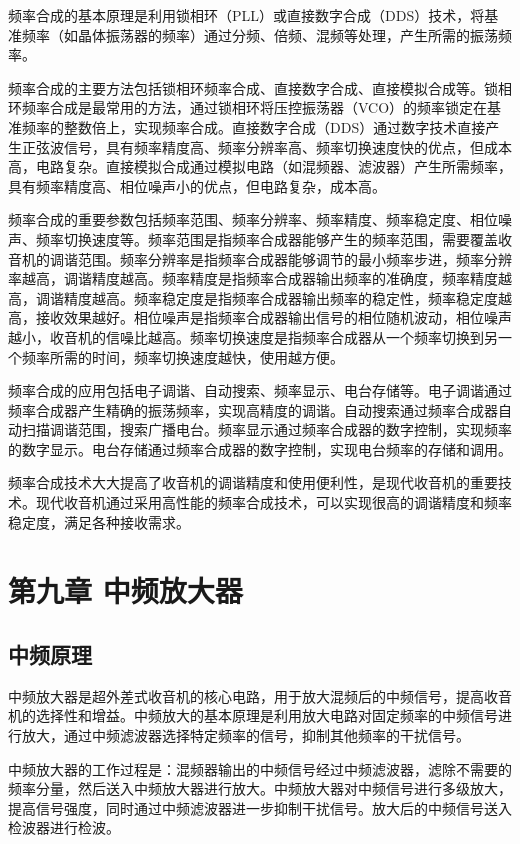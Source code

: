 \documentclass[12pt,UTF8]{ctexbook}
\begin{document}
频率合成的基本原理是利用锁相环（PLL）或直接数字合成（DDS）技术，将基准频率（如晶体振荡器的频率）通过分频、倍频、混频等处理，产生所需的振荡频率。

频率合成的主要方法包括锁相环频率合成、直接数字合成、直接模拟合成等。锁相环频率合成是最常用的方法，通过锁相环将压控振荡器（VCO）的频率锁定在基准频率的整数倍上，实现频率合成。直接数字合成（DDS）通过数字技术直接产生正弦波信号，具有频率精度高、频率分辨率高、频率切换速度快的优点，但成本高，电路复杂。直接模拟合成通过模拟电路（如混频器、滤波器）产生所需频率，具有频率精度高、相位噪声小的优点，但电路复杂，成本高。

频率合成的重要参数包括频率范围、频率分辨率、频率精度、频率稳定度、相位噪声、频率切换速度等。频率范围是指频率合成器能够产生的频率范围，需要覆盖收音机的调谐范围。频率分辨率是指频率合成器能够调节的最小频率步进，频率分辨率越高，调谐精度越高。频率精度是指频率合成器输出频率的准确度，频率精度越高，调谐精度越高。频率稳定度是指频率合成器输出频率的稳定性，频率稳定度越高，接收效果越好。相位噪声是指频率合成器输出信号的相位随机波动，相位噪声越小，收音机的信噪比越高。频率切换速度是指频率合成器从一个频率切换到另一个频率所需的时间，频率切换速度越快，使用越方便。

频率合成的应用包括电子调谐、自动搜索、频率显示、电台存储等。电子调谐通过频率合成器产生精确的振荡频率，实现高精度的调谐。自动搜索通过频率合成器自动扫描调谐范围，搜索广播电台。频率显示通过频率合成器的数字控制，实现频率的数字显示。电台存储通过频率合成器的数字控制，实现电台频率的存储和调用。

频率合成技术大大提高了收音机的调谐精度和使用便利性，是现代收音机的重要技术。现代收音机通过采用高性能的频率合成技术，可以实现很高的调谐精度和频率稳定度，满足各种接收需求。

\chapter{第九章 中频放大器}

\section{中频原理}

中频放大器是超外差式收音机的核心电路，用于放大混频后的中频信号，提高收音机的选择性和增益。中频放大的基本原理是利用放大电路对固定频率的中频信号进行放大，通过中频滤波器选择特定频率的信号，抑制其他频率的干扰信号。

中频放大器的工作过程是：混频器输出的中频信号经过中频滤波器，滤除不需要的频率分量，然后送入中频放大器进行放大。中频放大器对中频信号进行多级放大，提高信号强度，同时通过中频滤波器进一步抑制干扰信号。放大后的中频信号送入检波器进行检波。
\end{document}
